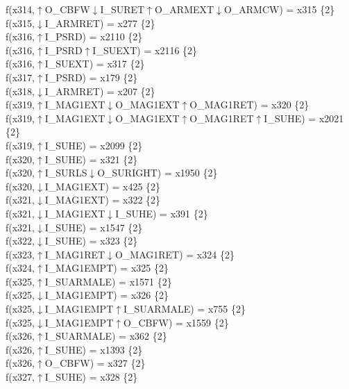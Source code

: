 f(x314,$\uparrow$O\_CBFW$\downarrow$I\_SURET$\uparrow$O\_ARMEXT$\downarrow$O\_ARMCW) = x315 \{2\} \\  
f(x315,$\downarrow$I\_ARMRET) = x277 \{2\} \\  
f(x316,$\uparrow$I\_PSRD) = x2110 \{2\} \\  
f(x316,$\uparrow$I\_PSRD$\uparrow$I\_SUEXT) = x2116 \{2\} \\  
f(x316,$\uparrow$I\_SUEXT) = x317 \{2\} \\  
f(x317,$\uparrow$I\_PSRD) = x179 \{2\} \\  
f(x318,$\downarrow$I\_ARMRET) = x207 \{2\} \\  
f(x319,$\uparrow$I\_MAG1EXT$\downarrow$O\_MAG1EXT$\uparrow$O\_MAG1RET) = x320 \{2\} \\  
f(x319,$\uparrow$I\_MAG1EXT$\downarrow$O\_MAG1EXT$\uparrow$O\_MAG1RET$\uparrow$I\_SUHE) = x2021 \{2\} \\  
f(x319,$\uparrow$I\_SUHE) = x2099 \{2\} \\  
f(x320,$\uparrow$I\_SUHE) = x321 \{2\} \\  
f(x320,$\uparrow$I\_SURLS$\downarrow$O\_SURIGHT) = x1950 \{2\} \\  
f(x320,$\downarrow$I\_MAG1EXT) = x425 \{2\} \\  
f(x321,$\downarrow$I\_MAG1EXT) = x322 \{2\} \\  
f(x321,$\downarrow$I\_MAG1EXT$\downarrow$I\_SUHE) = x391 \{2\} \\  
f(x321,$\downarrow$I\_SUHE) = x1547 \{2\} \\  
f(x322,$\downarrow$I\_SUHE) = x323 \{2\} \\  
f(x323,$\uparrow$I\_MAG1RET$\downarrow$O\_MAG1RET) = x324 \{2\} \\  
f(x324,$\uparrow$I\_MAG1EMPT) = x325 \{2\} \\  
f(x325,$\uparrow$I\_SUARMALE) = x1571 \{2\} \\  
f(x325,$\downarrow$I\_MAG1EMPT) = x326 \{2\} \\  
f(x325,$\downarrow$I\_MAG1EMPT$\uparrow$I\_SUARMALE) = x755 \{2\} \\  
f(x325,$\downarrow$I\_MAG1EMPT$\uparrow$O\_CBFW) = x1559 \{2\} \\  
f(x326,$\uparrow$I\_SUARMALE) = x362 \{2\} \\  
f(x326,$\uparrow$I\_SUHE) = x1393 \{2\} \\  
f(x326,$\uparrow$O\_CBFW) = x327 \{2\} \\  
f(x327,$\uparrow$I\_SUHE) = x328 \{2\} \\  
